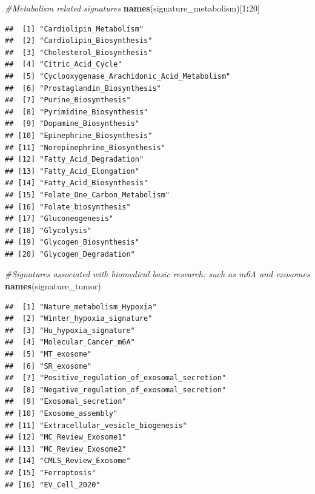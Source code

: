 \documentclass[
  12pt,
]{book}
\newenvironment{Shaded}{\begin{snugshade}}{\end{snugshade}}
\newcommand{\CommentTok}[1]{\textcolor[rgb]{0.56,0.35,0.01}{\textit{#1}}}
\newcommand{\DecValTok}[1]{\textcolor[rgb]{0.00,0.00,0.81}{#1}}
\newcommand{\FunctionTok}[1]{\textcolor[rgb]{0.13,0.29,0.53}{\textbf{#1}}}
\newcommand{\NormalTok}[1]{#1}
\newcommand{\SpecialCharTok}[1]{\textcolor[rgb]{0.81,0.36,0.00}{\textbf{#1}}}
\theoremstyle{definition}
\theoremstyle{definition}
\theoremstyle{definition}
\theoremstyle{definition}
\theoremstyle{remark}
\begin{document}
\begin{Shaded}
\begin{Highlighting}[]
\CommentTok{\#Metabolism related signatures}
\FunctionTok{names}\NormalTok{(signature\_metabolism)[}\DecValTok{1}\SpecialCharTok{:}\DecValTok{20}\NormalTok{]}
\end{Highlighting}
\end{Shaded}

\begin{verbatim}
##  [1] "Cardiolipin_Metabolism"                    
##  [2] "Cardiolipin_Biosynthesis"                  
##  [3] "Cholesterol_Biosynthesis"                  
##  [4] "Citric_Acid_Cycle"                         
##  [5] "Cyclooxygenase_Arachidonic_Acid_Metabolism"
##  [6] "Prostaglandin_Biosynthesis"                
##  [7] "Purine_Biosynthesis"                       
##  [8] "Pyrimidine_Biosynthesis"                   
##  [9] "Dopamine_Biosynthesis"                     
## [10] "Epinephrine_Biosynthesis"                  
## [11] "Norepinephrine_Biosynthesis"               
## [12] "Fatty_Acid_Degradation"                    
## [13] "Fatty_Acid_Elongation"                     
## [14] "Fatty_Acid_Biosynthesis"                   
## [15] "Folate_One_Carbon_Metabolism"              
## [16] "Folate_biosynthesis"                       
## [17] "Gluconeogenesis"                           
## [18] "Glycolysis"                                
## [19] "Glycogen_Biosynthesis"                     
## [20] "Glycogen_Degradation"
\end{verbatim}

\begin{Shaded}
\begin{Highlighting}[]
\CommentTok{\#Signatures associated with biomedical basic research: such as m6A and exosomes}
\FunctionTok{names}\NormalTok{(signature\_tumor)}
\end{Highlighting}
\end{Shaded}

\begin{verbatim}
##  [1] "Nature_metabolism_Hypoxia"                
##  [2] "Winter_hypoxia_signature"                 
##  [3] "Hu_hypoxia_signature"                     
##  [4] "Molecular_Cancer_m6A"                     
##  [5] "MT_exosome"                               
##  [6] "SR_exosome"                               
##  [7] "Positive_regulation_of_exosomal_secretion"
##  [8] "Negative_regulation_of_exosomal_secretion"
##  [9] "Exosomal_secretion"                       
## [10] "Exosome_assembly"                         
## [11] "Extracellular_vesicle_biogenesis"         
## [12] "MC_Review_Exosome1"                       
## [13] "MC_Review_Exosome2"                       
## [14] "CMLS_Review_Exosome"                      
## [15] "Ferroptosis"                              
## [16] "EV_Cell_2020"
\end{verbatim}
\end{document}

